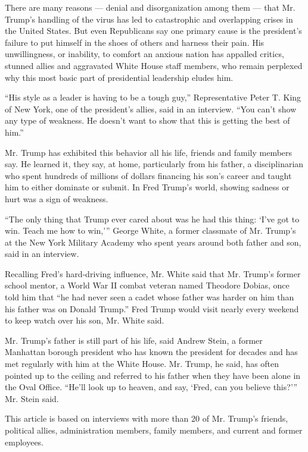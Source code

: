 There are many reasons --- denial and disorganization among them ---
that Mr. Trump's handling of the virus has led to catastrophic and
overlapping crises in the United States. But even Republicans say one
primary cause is the president's failure to put himself in the shoes of
others and harness their pain. His unwillingness, or inability, to
comfort an anxious nation has appalled critics, stunned allies and
aggravated White House staff members, who remain perplexed why this most
basic part of presidential leadership eludes him.

``His style as a leader is having to be a tough guy,'' Representative
Peter T. King of New York, one of the president's allies, said in an
interview. ``You can't show any type of weakness. He doesn't want to
show that this is getting the best of him.''

Mr. Trump has exhibited this behavior all his life, friends and family
members say. He learned it, they say, at home, particularly from his
father, a disciplinarian who spent hundreds of millions of dollars
financing his son's career and taught him to either dominate or submit.
In Fred Trump's world, showing sadness or hurt was a sign of weakness.

``The only thing that Trump ever cared about was he had this thing:
`I've got to win. Teach me how to win,''' George White, a former
classmate of Mr. Trump's at the New York Military Academy who spent
years around both father and son, said in an interview.

Recalling Fred's hard-driving influence, Mr. White said that Mr. Trump's
former school mentor, a World War II combat veteran named Theodore
Dobias, once told him that ``he had never seen a cadet whose father was
harder on him than his father was on Donald Trump.'' Fred Trump would
visit nearly every weekend to keep watch over his son, Mr. White said.

Mr. Trump's father is still part of his life, said Andrew Stein, a
former Manhattan borough president who has known the president for
decades and has met regularly with him at the White House. Mr. Trump, he
said, has often pointed up to the ceiling and referred to his father
when they have been alone in the Oval Office. ``He'll look up to heaven,
and say, `Fred, can you believe this?''' Mr. Stein said.

This article is based on interviews with more than 20 of Mr. Trump's
friends, political allies, administration members, family members, and
current and former employees.

